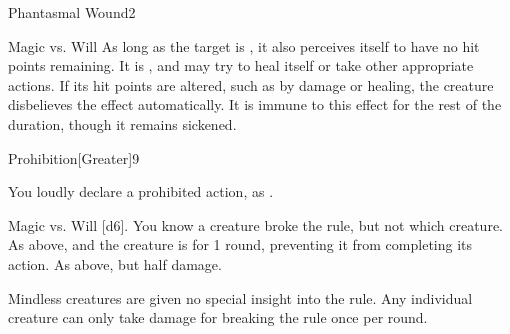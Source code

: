 \begin{spellfooter}
\begin{spellsection}{Phantasmal Wound}{2}
\begin{spellcontent}
\begin{spelleffects}
\begin{spellattack}{Magic vs. Will}
                As long as the target is \bloodied, it also perceives itself to have no hit points remaining. It is \staggered, and may try to heal itself or take other appropriate actions. If its hit points are altered, such as by damage or healing, the creature disbelieves the effect automatically. It is immune to this effect for the rest of the duration, though it remains sickened.
            \end{spellattack}
            \spelldur \durshort
        \end{spelleffects}
    \end{spellcontent}
    \begin{spellfooter}
    \end{spellfooter}
\end{spellsection}

\begin{spellsection}{Prohibition}[Greater]{9}
    \begin{spellheader}
    \end{spellheader}
    \begin{spellcontent}
        \spelleffect You loudly declare a prohibited action, as .
        \spelldur \durshort
    \end{spellcontent}
    \begin{spellsubcontent}
        \begin{spelltargetinginfo}
        \end{spelltargetinginfo}
        \begin{spelleffects}
            \begin{spellattack}{Magic vs. Will}
                \spellsuccess \spelldamage{}[d6]. You know a creature broke the rule, but not which creature.
                \spellcritical As above, and the creature is \stunned for 1 round, preventing it from completing its action.
                \spellfailure As above, but half damage.
            \end{spellattack}
        \end{spelleffects}
    \end{spellsubcontent}
    \begin{spellfooter}
        \spellnotes Mindless creatures are given no special insight into the rule. Any individual creature can only take damage for breaking the rule once per round.
    \end{spellfooter}
\end{spellsection}


\end{spellfooter}
